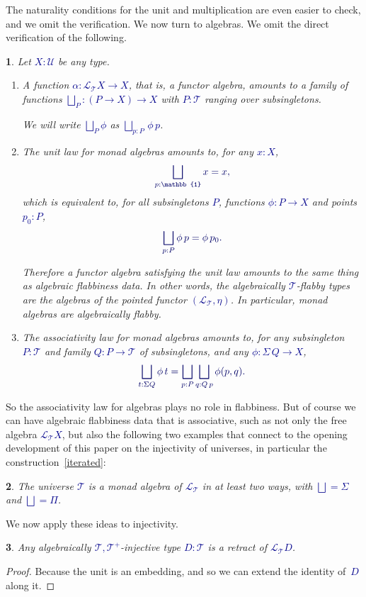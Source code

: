 \documentclass[10pt]{article}
\newcommand{\db}{\textcolor{darkblue}}
\newcommand{\m}[1]{\db{$#1$}}
\newcommand{\M}[1]{\[\db{#1}\]}
\newcommand{\U}{\mathcal{U}}
\newcommand{\T}{\mathcal{T}}
\newcommand{\Lift}{\mathcal{L}}
\newcommand{\One}{\mathbb{1}}
\newtheorem{numbered}{}
\theoremstyle{definition}
\begin{document}
\noindent The naturality conditions for the unit and multiplication are
even easier to check, and we omit the verification. We now turn to
algebras. We omit the direct verification of the following.

\begin{numbered} Let \m{X:\U} be any type.
  \begin{enumerate}
  \item A function \m{\alpha : \Lift_\T X \to X}, that is, a functor
    algebra, amounts to a family of functions \m{\bigsqcup_P : (P \to
      X) \to X} with \m{P : \T} ranging over subsingletons.


    \medskip We will write \m{\bigsqcup_P \phi} as \m{\bigsqcup_{p : P} \, \phi \, p}.
  \item The unit law for monad algebras amounts to, for any \m{x:X},
    \M{
       \bigsqcup_{p : \One} x = x,
    }
    which is equivalent to, for all subsingletons \m{P}, functions \m{\phi : P \to X} and points \m{p_0 : P},
    \M{
       \bigsqcup_{p : P} \phi \, p = \phi \, p_0.
    }


    \medskip Therefore a functor algebra satisfying the unit law
    amounts to the same thing as algebraic flabbiness data. In other
    words, the algebraically \m{\T}-flabby types are the algebras of
    the pointed functor \m{(\Lift_\T,\eta)}. In particular,
    monad algebras are algebraically flabby.
  \item The associativity law for monad algebras amounts to, for any subsingleton \m{P :
      \T} and family \m{Q : P \to \T} of subsingletons, and any \m{\phi : \Sigma \, Q \to X},
    \M{
      \bigsqcup_{t : \Sigma Q} \phi \, t = \bigsqcup_{p : P} \bigsqcup_{q : Q \, p} \phi (p ,q).
    }
  \end{enumerate}
\end{numbered}
\noindent So the associativity law for algebras plays no role in
flabbiness. But of course we can have algebraic flabbiness data that
is associative, such as not only the free algebra \m{\Lift_\T X}, but
also the following two examples that connect to the opening
development of this paper on the injectivity of universes, in
particular the construction~\ref{iterated}:
\begin{numbered} The universe \m{\T} is a monad algebra of
  \m{\Lift_\T} in at least two ways, with \m{\bigsqcup = \Sigma} and
  \m{\bigsqcup = \Pi}.
\end{numbered}


We now apply these ideas to injectivity.
\begin{numbered}
  Any algebraically \m{\T,\T^+}-injective type \m{D:\T} is a retract of \m{\Lift_\T D}.
\end{numbered}
\begin{proof}
  Because the unit is an embedding, and so we can extend the identity of~\m{D} along it.
\end{proof}
\end{document}
